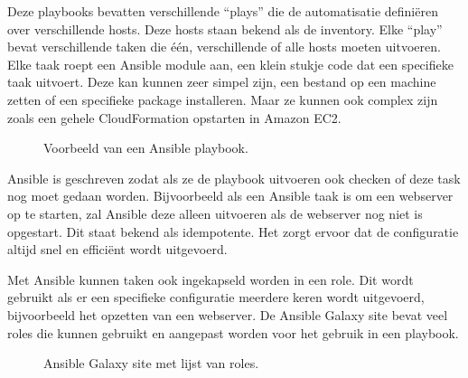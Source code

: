 Deze playbooks bevatten verschillende ``plays'' die de automatisatie definiëren over verschillende hosts. Deze hosts staan bekend als de inventory. Elke ``play'' bevat verschillende taken die één, verschillende of alle hosts moeten uitvoeren. Elke taak roept een Ansible module aan, een klein stukje code dat een specifieke taak uitvoert. Deze kan kunnen zeer simpel zijn, een bestand op een machine zetten of een specifieke package installeren. Maar ze kunnen ook complex zijn zoals een gehele CloudFormation opstarten in Amazon EC2.
\begin{figure}[!htb]
    \caption{Voorbeeld van een Ansible playbook.}
    \label{fig:playbook}
\end{figure}

Ansible is geschreven zodat als ze de playbook uitvoeren ook checken of deze task nog moet gedaan worden. Bijvoorbeeld als een Ansible taak is om een webserver op te starten, zal Ansible deze alleen uitvoeren als de webserver nog niet is opgestart. Dit staat bekend als idempotente. Het zorgt ervoor dat de configuratie altijd snel en efficiënt wordt uitgevoerd.

Met Ansible kunnen taken ook ingekapseld worden in een role. Dit wordt gebruikt als er een specifieke configuratie meerdere keren wordt uitgevoerd, bijvoorbeeld het opzetten van een webserver. De Ansible Galaxy site bevat veel roles die kunnen gebruikt en aangepast worden voor het gebruik in een playbook.
\begin{figure}[!htb]
    \caption{Ansible Galaxy site met lijst van roles.}
    \label{fig:agalaxy}
\end{figure}



